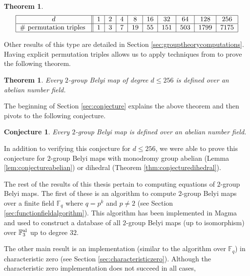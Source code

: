 \documentclass{dcthesis}
\newcommand{\FF}{\mathbb{F}}
\numberwithin{equation}{section}
\newtheorem{theorem}[equation]{Theorem}
\newtheorem{conj}[equation]{Conjecture}
\theoremstyle{definition}
\theoremstyle{remark}
\begin{document}
{{{\begin{theorem}
\begin{equation}
        \label{eqn:}
        \begin{tabular}{|c||c|c|c|c|c|c|c|c|c|}
          \hline
          $d$ & $1$ & $2$ & $4$ & $8$ & $16$ & $32$ & $64$ & $128$ & $256$\\
          \hline
          \#\text{ permutation triples } & $1$ & $3$ & $7$ & $19$ & $55$ & $151$ & $503$ & $1799$ & $7175$\\
          \hline
        \end{tabular}
      \end{equation}
    \end{theorem}
    Other results of this type are
    detailed in
    Section \ref{sec:grouptheorycomputations}.
    Having explicit permutation triples
    allows us to apply techniques from
    \cite{belyidb}
    to prove the following theorem.
    \begin{theorem}
      \label{thm:conj_up_to_256_results}
      Every $2$-group Belyi map
      of degree $d\leq 256$ is defined over
      an abelian number field.
    \end{theorem}
    The beginning of
    Section \ref{sec:conjecture}
    explains the above theorem and then
    pivots to the following conjecture.
    \begin{conj}
      \label{conj:conjecture_results}
      Every $2$-group Belyi map
      is defined over an abelian number field.
    \end{conj}
    In addition to verifying this conjecture
    for $d\leq 256$,
    we were able to prove this conjecture
    for $2$-group Belyi maps
    with monodromy group abelian
    (Lemma \ref{lem:conjectureabelian})
    or dihedral
    (Theorem \ref{thm:conjecturedihedral}).
    \par
    The rest of the results of this thesis
    pertain to computing equations
    of $2$-group Belyi maps.
    The first of these is an algorithm
    to compute $2$-group Belyi maps
    over a finite field $\FF_q$
    where $q=p^k$ and $p\neq 2$
    (see Section \ref{sec:functionfieldalgorithm}).
    This algorithm has been implemented in
    \textsf{Magma}
    and used to construct a database
    of all $2$-group Belyi maps
    (up to isomorphism)
    over
    $\FF_3^\textup{al}$
    up to degree $32$.
    \par
    The other main result is an implementation
    (similar to the algorithm over 
    $\FF_q$)
    in characteristic zero
    (see Section
    \ref{sec:characteristiczero}).
    Although the characteristic zero
    implementation does not succeed in all cases,
}}}
\end{document}
